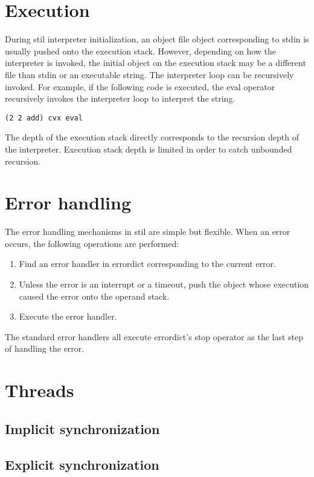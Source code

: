 \section{Execution}

During stil interpreter initialization, an object file object corresponding to
stdin is usually pushed onto the execution stack.  However, depending on how the
interpreter is invoked, the initial object on the execution stack may be a
different file than stdin or an executable string.  The interpreter loop can be
recursively invoked.  For example, if the following code is executed, the eval
operator recursively invokes the interpreter loop to interpret the string.
\begin{verbatim}
(2 2 add) cvx eval
\end{verbatim}

The depth of the execution stack directly corresponds to the recursion depth of
the interpreter.  Execution stack depth is limited in order to catch unbounded
recursion.

\section{Error handling}

The error handling mechanisms in stil are simple but flexible.  When an error
occurs, the following operations are performed:
\begin{enumerate}
\item{Find an error handler in errordict corresponding to the current error.}
\item{Unless the error is an interrupt or a timeout, push the object whose
execution caused the error onto the operand stack.}
\item{Execute the error handler.}
\end{enumerate}

The standard error handlers all execute errordict's stop operator as the last
step of handling the error.

\section{Threads}
\subsection{Implicit synchronization}
\subsection{Explicit synchronization}

